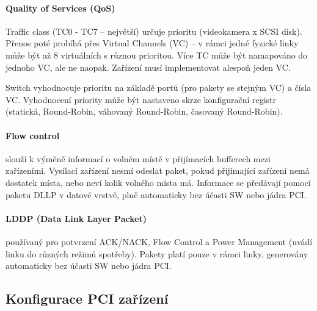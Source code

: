 \documentclass[a4paper, 11pt]{report}
\begin{document}
\paragraph{Quality of Services (QoS)} Traffic class (TC0 - TC7 -- největší) určuje prioritu (videokamera x SCSI disk).
Přenos poté probíhá přes Virtual Channels (VC) -- v rámci jedné fyzické linky může být až 8 virtuálních s různou prioritou. Více TC může být namapováno do jednoho VC, ale ne naopak. Zařízení musí implementovat alespoň jeden VC.

Switch vyhodnocuje prioritu na základě portů (pro pakety se stejným VC) a čísla VC. Vyhodnocení priority může být nastaveno skrze konfigurační registr (statická, Round-Robin, váhovaný Round-Robin, časovaný Round-Robin).

\paragraph{Flow control} slouží k výměně informací o volném místě v přijímacích bufferech mezi zařízeními. Vysílací zařízení nesmí odeslat paket, pokud přijímající zařízení nemá dostatek místa, nebo neví kolik volného místa má. Informace se předávají pomocí paketu DLLP v datové vrstvě, plně automaticky bez účasti SW nebo jádra PCI.

\paragraph{LDDP (Data Link Layer Packet)} používaný pro potvrzení ACK/NACK, Flow Control a Power Management (uvádí linku do různých režimů spotřeby). Pakety platí pouze v rámci linky, generovány automaticky bez účasti SW nebo jádra PCI.

\subsection{Konfigurace PCI zařízení}
\end{document}
